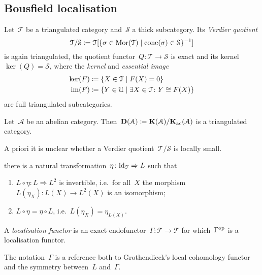 \documentclass[10pt,a4paper]{article}
\begin{document}
\subsection{Bousfield localisation}
Let~$\mathcal{T}$ be a triangulated category and~$\mathcal{S}$ a thick subcategory. Its \emph{Verdier quotient}
\begin{equation}
  \mathcal{T}/\mathcal{S}\coloneqq\mathcal{T}[\{\sigma\in\operatorname{Mor}(\mathcal{T})\mid\operatorname{cone}(\sigma)\in\mathcal{S}\}^{-1}]
\end{equation}
is again triangulated, the quotient functor~$Q\colon\mathcal{T}\to\mathcal{S}$ is exact and its kernel~$\ker(Q)=\mathcal{S}$, where the \emph{kernel} and \emph{essential image}
\begin{equation}
  \begin{aligned}
    \ker(F)&\coloneqq\{X\in\mathcal{T}\mid F(X)=0\} \\
    \operatorname{im}(F)&\coloneqq\{Y\in\mathcal{U}\mid \exists X\in\mathcal{T}\colon Y\cong F(X)\}
  \end{aligned}
\end{equation}
are full triangulated subcategories.
\begin{example}
  Let~$\mathcal{A}$ be an abelian category. Then~$\mathbf{D}(\mathcal{A})\coloneqq\mathbf{K}(\mathcal{A})/\mathbf{K}_{\mathrm{ac}}(\mathcal{A})$ is a triangulated category.
\end{example}
\begin{remark}
  A priori it is unclear whether a Verdier quotient~$\mathcal{T}/\mathcal{S}$ is locally small.
\end{remark}
\begin{definition}
   there is a natural transformation~$\eta\colon\mathrm{id}_{\mathcal{T}}\Rightarrow L$ such that
  \begin{enumerate}
    \item $L\circ\eta\colon L\Rightarrow L^2$ is invertible, i.e.\ for all~$X$ the morphism~$L(\eta_X)\colon L(X)\to L^2(X)$ is an isomorphism;
    \item $L\circ\eta=\eta\circ L$, i.e.\ $L(\eta_X)=\eta_{L(X)}$.
  \end{enumerate}
\end{definition}
\begin{definition}
  A \emph{localisation functor} is an exact endofunctor~$\Gamma\colon\mathcal{T}\to\mathcal{T}$ for which~$\Gamma^{\mathrm{op}}$ is a localisation functor.
\end{definition}
\begin{remark}
  The notation~$\Gamma$ is a reference both to Grothendieck's local cohomology functor and the symmetry between~$L$ and~$\Gamma$.
\end{remark}
\end{document}
